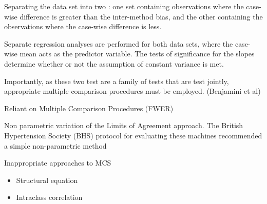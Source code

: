 Separating the data set into two : one set containing observations where the case-wise difference is greater than the inter-method bias, and the other containing the observations where the case-wise difference is less.

Separate regression analyses are performed for both data sets, where the case-wise mean acts as the predictor variable. The tests of significance for the slopes determine whether or not the assumption of constant variance is met.

Importantly, as these two test are a family of tests that are test jointly, appropriate multiple comparison procedures must be employed.  (Benjamini et al) 

	Reliant on Multiple Comparison Procedures (FWER)


Non parametric variation of the Limits of Agreement  approach.
The British Hypertension Society (BHS) protocol for evaluating these machines recommended a simple non-parametric method

Inappropriate approaches to MCS
\begin{itemize}
\item	Structural equation 
\item 	Intraclass correlation
\end{itemize}

